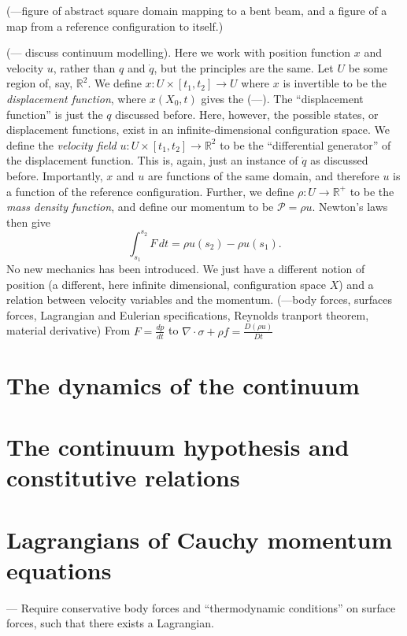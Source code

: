 \documentclass[11pt,a4paper]{memoir}
\newcommand{\fancyP}{\mathcal{P}}
\begin{document}
(---figure of abstract square domain mapping to a bent beam, and a figure of a map from a reference configuration to itself.)




(--- discuss continuum modelling).
Here we work with position function $x$ and velocity $u$, rather than $q$ and $\dot{q}$, but the principles are the same.
Let $U$ be some region of, say, $\mathbb{R}^2$.
We define $x : U\times [t_1, t_2] \rightarrow U$ where $x$ is invertible to be the \textit{displacement function},
where $x(X_0, t)$ gives the (---).
The ``displacement function'' is just the $q$ discussed before. Here, however, the possible states, or displacement functions,
exist in an infinite-dimensional configuration space. We define the \textit{velocity field} $u: U \times [t_1, t_2] \rightarrow \mathbb{R}^2$
to be the ``differential generator'' of the displacement function. This is, again, just an instance of $\dot{q}$ as discussed before.
Importantly, $x$ and $u$ are functions of the same domain, and therefore $u$ is a function of the reference configuration.
Further, we define $\rho : U \rightarrow \mathbb{R}^{+}$ to be the \textit{mass density function}, and define our momentum to be
$\fancyP = \rho u$.
Newton's laws then give
    $$\int_{s_1}^{s_2} F\,dt = \rho u(s_2) - \rho u(s_1).$$
No new mechanics has been introduced. We just have a different notion of position (a different, here infinite dimensional, configuration space $X$)
and a relation between velocity variables and the momentum.
(---body forces, surfaces forces, Lagrangian and Eulerian specifications, Reynolds tranport theorem, material derivative)
From $F = \frac{dp}{dt}$ to $\nabla\cdot\sigma + \rho f = \frac{D(\rho u)}{Dt}$
\section{The dynamics of the continuum} %
\section{The continuum hypothesis and constitutive relations} %
\section{Lagrangians of Cauchy momentum equations} %
--- Require conservative body forces and ``thermodynamic conditions'' on surface forces, such that there exists a Lagrangian.
\end{document}
